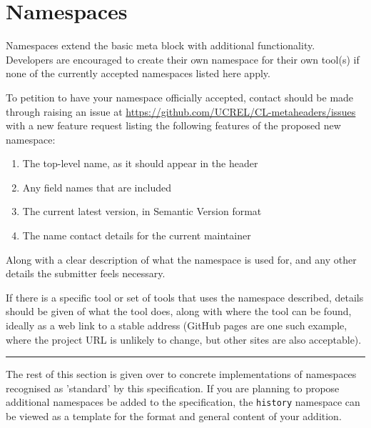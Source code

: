 \chapter{Namespaces}

Namespaces extend the basic meta block with additional functionality.
Developers are encouraged to create their own namespace for their own tool(s) if none of the currently accepted namespaces listed here apply.

To petition to have your namespace officially accepted, contact should be made through raising an issue at \url{https://github.com/UCREL/CL-metaheaders/issues} with a new feature request listing the following features of the proposed new namespace:

\begin{enumerate}
    \item The top-level name, as it should appear in the header
    \item Any field names that are included
    \item The current latest version, in Semantic Version\cite{semver} format
    \item The name contact details for the current maintainer
\end{enumerate}

Along with a clear description of what the namespace is used for, and any other details the submitter feels necessary.

If there is a specific tool or set of tools that uses the namespace described, details should be given of what the tool does, along with where the tool can be found, ideally as a web link to a stable address (GitHub pages are one such example, where the project URL is unlikely to change, but other sites are also acceptable).

\vspace{3em}\hrule\vspace{3em}

The rest of this section is given over to concrete implementations of namespaces recognised as 'standard' by this specification.
If you are planning to propose additional namespaces be added to the specification, the \texttt{history} namespace can be viewed as a template for the format and general content of your addition.

\clearpage